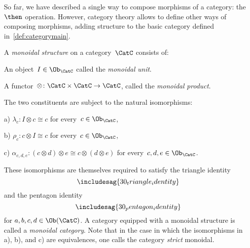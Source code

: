 So far, we have described a single way to compose morphisms of a category: the~$\then$ operation. However, category theory allows to define other ways of composing morphisms, adding structure to the basic category defined in~\cref{def:categorymain}.
\begin{ctdefinition}\label{def:monoidal_cat}
A \emph{monoidal structure} on a category~$\CatC$ consists of:
\begin{compactenum}
    \item An object~$I\in \Ob_\CatC$ called the \emph{monoidal unit}.
    \item A functor~$\otimes \colon \CatC \times \CatC\to \CatC$, called the \emph{monoidal product}.
\end{compactenum}
The two constituents are subject to the natural isomorphisms:
\begin{compactenum}
    \item[a)] $\lambda_c \colon I\otimes c \cong c$ for every~$c\in \Ob_\CatC$,
    \item[b)] $\rho_c \colon c\otimes I \cong c$ for every~$c\in \Ob_\CatC$,
    \item[c)] $\alpha_{c,d,e}\colon (c\otimes d)\otimes e \cong c\otimes (d\otimes e)$ for every~$c,d,e\in \Ob_\CatC$.
\end{compactenum}
These isomorphisms are themselves required to satisfy the triangle identity
\begin{equation}
\includesag{30_triangle_identity}
\end{equation}
and the pentagon identity
\begin{equation}
\includesag{30_pentagon_identity}
\end{equation}
for $a,b,c,d\in \Ob(\CatC)$.
\noindent A category equipped with a monoidal structure is called a \emph{monoidal category}. Note that in the case in which the isomorphisms in a), b), and c) are equivalences, one calls the category \emph{strict} monoidal.
\end{ctdefinition}

